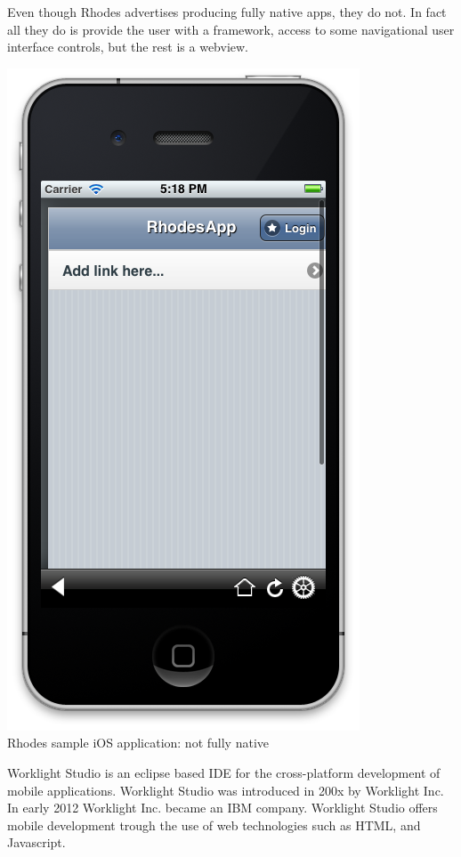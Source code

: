 Even though Rhodes advertises producing fully native apps\cite{RhoMobile}, they do not. In fact all they do is provide the user with a framework, access to some navigational user interface controls, but the rest is a webview.
\begin{centering}
	\includegraphics[scale=0.3]{images/rhodes_notsonative.png}\\{Rhodes sample iOS application: not fully native}\\
\end{centering}





Worklight Studio is an eclipse based IDE for the cross-platform development of mobile applications. Worklight Studio was introduced in 200x by Worklight Inc. In early 2012 Worklight Inc. became an IBM company. Worklight Studio offers mobile development trough the use of web technologies such as HTML, and Javascript.

